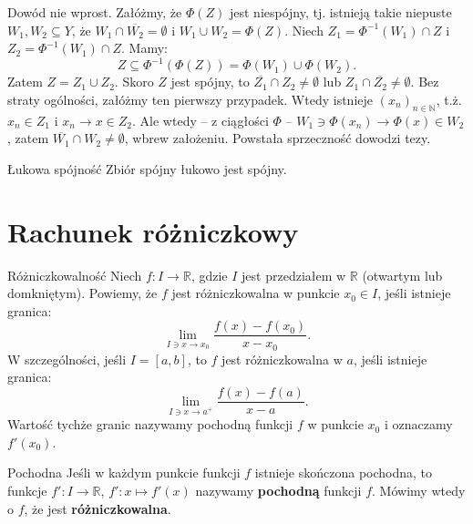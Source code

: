 \documentclass{article}
\numberwithin{defi}{section}
\numberwithin{defi}{section}
\newcommand{\R}{\mathbb{R}}
\newcommand{\N}{\mathbb{N}}
\newcommand{\se}{\subseteq}
\providecommand{\ol}{\overline}
\newcommand{\ciag}[1]{(#1_{n})_{n \in \N}}
\begin{document}
\begin{dow}
    Dowód nie wprost. Załóżmy, że $\Phi(Z)$ jest niespójny, tj. istnieją takie niepuste $W_1, W_2 \se Y$, że $W_1 \cap \ol{W_2} = \emptyset$ i $W_1 \cup W_2 = \Phi(Z)$. Niech $Z_1 = \Phi^{-1}(W_1) \cap Z$ i $Z_2 = \Phi^{-1}(W_1) \cap Z$. Mamy: \begin{equation*}
        Z \se \Phi^{-1}(\Phi(Z)) = \Phi(W_1) \cup \Phi(W_2).
    \end{equation*} Zatem $Z = Z_1 \cup Z_2$. Skoro $Z$ jest spójny, to $\ol{Z_1} \cap Z_2 \neq \emptyset$ lub $Z_1 \cap \ol{Z_2} \neq \emptyset$. Bez straty ogólności, załóżmy ten pierwszy przypadek. Wtedy istnieje $\ciag{x}$, t.ż. $x_n \in Z_1$ i $x_n \to x \in Z_2$. Ale wtedy -- z ciągłości $\Phi$ -- $W_1 \ni \Phi(x_n) \to \Phi(x) \in W_2$, zatem $\ol{W_1} \cap W_2 \neq \emptyset$, wbrew założeniu. Powstała sprzeczność dowodzi tezy.
\end{dow}

\begin{obs}{Łukowa spójność}
    Zbiór spójny łukowo jest spójny.
\end{obs}





\newpage
\section{Rachunek różniczkowy}

    \begin{defr}{Różniczkowalność}
        Niech $f: I \to \R$, gdzie $I$ jest przedziałem w $\R$ (otwartym lub domkniętym). Powiemy, że $f$ jest różniczkowalna w punkcie $x_0 \in I$, jeśli istnieje granica: \begin{equation}
            \lim_{I \ni x \to x_0} \frac{f(x) - f(x_0)}{x - x_0}.
        \end{equation} W szczególności, jeśli $I = [a, b]$, to $f$ jest różniczkowalna w $a$, jeśli istnieje granica: \begin{equation}
            \lim_{I \ni x \to a^+} \frac{f(x) - f(a)}{x - a}.
        \end{equation} Wartość tychże granic nazywamy pochodną funkcji $f$ w punkcie $x_0$ i oznaczamy $f'(x_0)$. 
    \end{defr}

    \begin{defr}{Pochodna}
        Jeśli w każdym punkcie funkcji $f$ istnieje skończona pochodna, to funkcje $f': I \to \R$, $f': x \mapsto f'(x)$ nazywamy \textbf{pochodną} funkcji $f$. Mówimy wtedy o $f$, że jest \textbf{różniczkowalna}.
    \end{defr}
\end{document}
